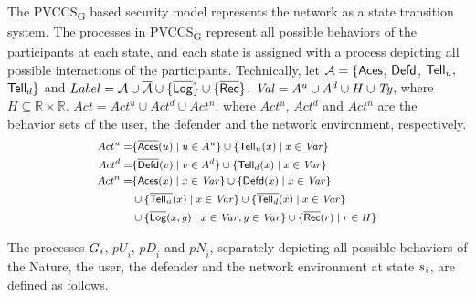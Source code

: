 \documentclass[10pt, conference, compsocconf]{IEEEtran}
\begin{document}
The PVCCS\textsubscript{G} based security model represents the network as a state transition system.
The processes in PVCCS\textsubscript{G} represent all possible behaviors of the participants at each state, and each state is assigned with a process depicting all possible interactions of the participants. Technically, let $\mathcal{A}=\{{\sf Aces}$, ${\sf Defd}$, ${\sf Tell}_u,$ ${\sf Tell}_d\}$ and $Label=\mathcal{A}\cup \overline{\mathcal{A}}\cup \{{\sf \overline{Log}}\}\cup \{{\sf \overline{Rec}}\}$.
${\it Val}=A^u\cup A^d\cup H\cup \textit{Ty}$, where $H \subseteq \mathds{R}\times\mathds{R}$.
$Act= Act^u\cup Act^d\cup Act^n$, where $Act^u$, $Act^d$ and $Act^n$ are the behavior sets of the user, the defender and the network environment, respectively.
\begin{equation*}
\footnotesize
\begin{aligned}
Act^u=&\{{\sf \overline{Aces}}(u)\mid u\in A^u \}\cup\{{\sf Tell}_u(x)\mid x\in {\it Var}\}\\
Act^d=&\{\overline{{\sf Defd}}(v)\mid v\in A^d \}\cup \{{\sf Tell}_d(x)\mid x\in {\it Var}\}\\
Act^n=&\{{\sf Aces}(x)\mid x\in {\it Var} \}\cup \{{\sf Defd}(x)\mid x\in {\it Var} \}\\
&\cup \{\overline{{\sf Tell}_u}(x)\mid x\in {\it Var} \}
\cup \{\overline{{\sf Tell}_d}(x)\mid x\in {\it Var}\}\\
&\cup \{\overline{{\sf Log}}(x,y)\mid x\in {\it Var}, y\in {\it Var}\}\cup \{\overline{{\sf Rec}}(r)\mid r\in H\}\\
\end{aligned}
\end{equation*}

The processes $G_{\it i}$,  $\textit{pU}_{i}$, $\textit{pD}_{i}$ and $\textit{pN}_{i}$, separately depicting all possible behaviors of the Nature, the user, the defender and the network environment at state $s_{\it i}$, are defined as follows.
\end{document}
